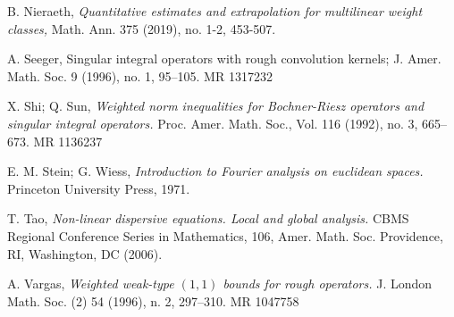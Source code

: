 \documentclass[a4paper,12pt]{amsart}
\begin{document}
\begin{thebibliography}{99}
 B. Nieraeth, {\it Quantitative estimates and extrapolation for multilinear weight classes,} Math. Ann. 375 (2019), no. 1-2, 453-507.

 A. Seeger, Singular integral operators with rough convolution kernels; J. Amer. Math. Soc. 9 (1996), no. 1, 95--105. MR 1317232

 X. Shi; Q. Sun, {\it Weighted norm inequalities for Bochner-Riesz operators and singular integral operators.}  Proc. Amer. Math. Soc., Vol. 116 (1992), no. 3, 665--673. MR 1136237

 E. M. Stein; G. Wiess, {\it Introduction to Fourier analysis on euclidean spaces.} Princeton University Press, 1971.  

 T. Tao, {\it Non-linear dispersive equations. Local and global analysis.} CBMS Regional Conference Series in Mathematics, 106, Amer. Math. Soc. Providence, RI, Washington, DC (2006).


 A. Vargas, {\it Weighted weak-type $(1,1)$ bounds for rough operators.} J. London Math. Soc. (2) 54 (1996), n. 2, 297--310. MR 1047758
\end{thebibliography}
\end{document}
